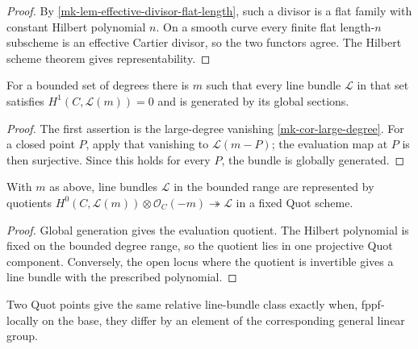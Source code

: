 \begin{proof}
  By \ref{mk-lem-effective-divisor-flat-length}, such a divisor is a flat
  family with constant Hilbert polynomial \(n\).  On a smooth curve every
  finite flat length-\(n\) subscheme is an effective Cartier divisor, so the
  two functors agree.  The Hilbert scheme theorem gives representability.
\end{proof}

\begin{lemma}
  \label{mk-lem-large-twist}
  \cite{hartshorne-ag,kleiman-picard}
  For a bounded set of degrees there is \(m\) such that every line bundle
  \(\mathcal L\) in that set satisfies
  \(H^1(C,\mathcal L(m))=0\) and is generated by its global sections.
\end{lemma}

\begin{proof}
  The first assertion is the large-degree vanishing
  \ref{mk-cor-large-degree}.  For a closed point \(P\), apply that vanishing
  to \(\mathcal L(m-P)\); the evaluation map at \(P\) is then surjective.
  Since this holds for every \(P\), the bundle is globally generated.
\end{proof}

\begin{proposition}
  \label{mk-prop-quot-line-bundles}
  \cite{kleiman-picard,nitsure-hilbert-quot}
  With \(m\) as above, line bundles \(\mathcal L\) in the bounded range are
  represented by quotients
  \(H^0(C,\mathcal L(m))\otimes\mathcal O_C(-m)\twoheadrightarrow\mathcal L\)
  in a fixed Quot scheme.
\end{proposition}

\begin{proof}
  Global generation gives the evaluation quotient.  The Hilbert polynomial is
  fixed on the bounded degree range, so the quotient lies in one projective
  Quot component.  Conversely, the open locus where the quotient is invertible
  gives a line bundle with the prescribed polynomial.
\end{proof}

\begin{lemma}
  \label{mk-lem-quot-generator-relation}
  \cite{kleiman-picard}
  Two Quot points give the same relative line-bundle class exactly when,
  fppf-locally on the base, they differ by an element of the corresponding
  general linear group.
\end{lemma}

